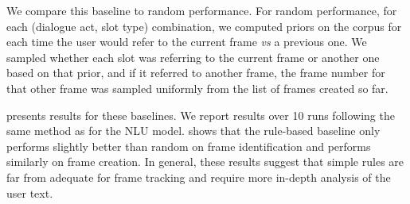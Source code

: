 \documentclass{article}
\theoremstyle{definition}
\begin{document}
We compare this baseline to random performance. For random performance, for each (dialogue act, slot type) combination, we computed priors on the corpus for each time the user would refer to the current frame \textit{vs} a previous one. We sampled whether each slot was referring to the current frame or another one based on that prior, and if it referred to another frame, the frame number for that other frame was sampled uniformly from the list of frames created so far.
%

 presents results for these baselines. We report results over 10 runs following the same method as for the NLU model.  shows that the rule-based baseline only performs slightly better than random on frame identification and performs similarly on frame creation. In general, these results suggest that simple rules are far from adequate for frame tracking and require more in-depth analysis of the user text.
\end{document}
